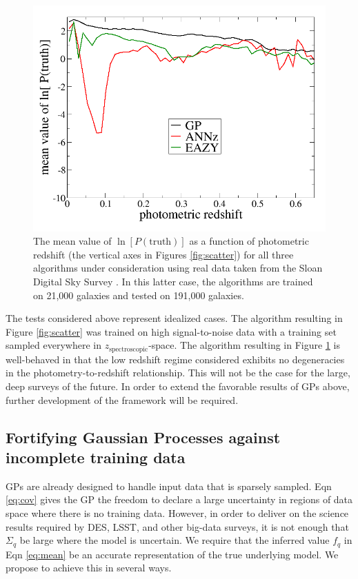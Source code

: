 \documentclass[prd,nofootbib,floatfix,11pt,tightenlines]{revtex4}
\begin{document}
\begin{figure}[t]
\centerline{\includegraphics[scale=0.3]{sdss_lnsum.png}}
\caption{
The mean value of
$\ln[P(\text{truth})]$ as a function of photometric redshift (the vertical
axes in Figures \ref{fig:scatter}) for all
three algorithms under consideration using real
data taken from the Sloan Digital Sky Survey \cite{Abazajian:2008wr}.  
In this latter case, the
algorithms are trained on 21,000 galaxies and tested on 191,000 galaxies.
}
\label{fig:lnsum}
\end{figure}

The tests considered above represent idealized cases.
The algorithm resulting in Figure \ref{fig:scatter} was trained on high
signal-to-noise data with a training set sampled everywhere in
$z_\text{spectroscopic}$-space.  The algorithm resulting in Figure
\ref{fig:lnsum} is well-behaved in that the low redshift regime considered
exhibits no degeneracies in the photometry-to-redshift relationship.  This will
not be the case for the large, deep surveys of the future.  In order to extend
the favorable results of GPs above, further development of the
framework will be required.

\subsection{Fortifying Gaussian Processes against incomplete training data}
\label{sec:sparse}


GPs are already designed to handle input data that is sparsely
sampled.  Eqn \ref{eq:cov} gives the GP the freedom to declare a large
uncertainty in regions of data space where there is no training data.  However,
in order to deliver on the science results required by DES, LSST, and other
big-data surveys, it is not enough that $\Sigma_q$ be large where the model is
uncertain.  We require that the inferred 
value $f_q$ in Eqn \ref{eq:mean} be an accurate
representation of the true underlying model.  
We propose to achieve this in several ways.
\end{document}
